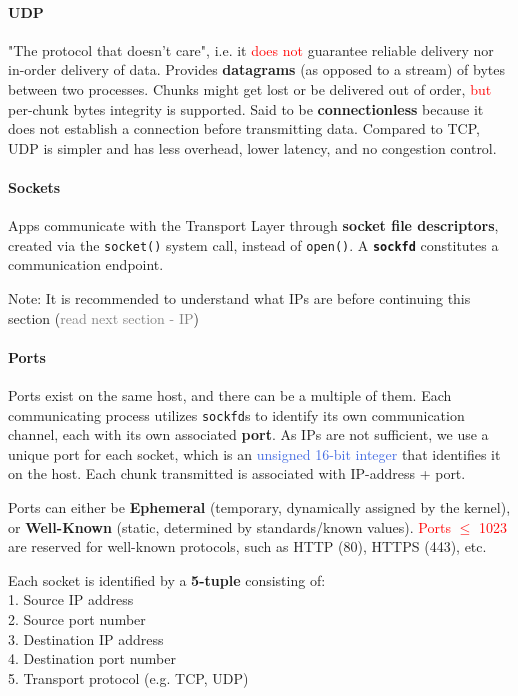 \documentclass[openany,12pt]{book}
\newcommand{\code}[1]{\texttt{#1}}
\newcommand{\red}[1]{\textcolor{Red}{#1}}
\newcommand{\blue}[1]{\textcolor{RoyalBlue}{#1}}
\newcommand{\gray}[1]{\textcolor{gray}{#1}}
\begin{document}
\paragraph{UDP} "The protocol that doesn't care", i.e. it \red{does not} guarantee reliable delivery nor in-order delivery of data. Provides \textbf{datagrams} (as opposed to a stream) of bytes between two processes. Chunks might get lost or be delivered out of order, \red{but} per-chunk bytes integrity is supported. Said to be \textbf{connectionless} because it does not establish a connection before transmitting data. Compared to TCP, UDP is simpler and has less overhead, lower latency, and no congestion control.

\paragraph{Sockets} Apps communicate with the Transport Layer through \textbf{socket file descriptors}, created via the \code{socket()} system call, instead of \code{open()}. A \textbf{\code{sockfd}} constitutes a communication endpoint.

Note: It is recommended to understand what IPs are before continuing this section (\gray{read next section - IP})

\paragraph{Ports} Ports exist on the same host, and there can be a multiple of them. Each communicating process utilizes \code{sockfd}s to identify its own communication channel, each with its own associated \textbf{port}. As IPs are not sufficient, we use a unique port for each socket, which is an \blue{unsigned 16-bit integer} that identifies it on the host. Each chunk transmitted is associated with IP-address + port.


Ports can either be \textbf{Ephemeral} (temporary, dynamically assigned by the kernel), or \textbf{Well-Known} (static, determined by standards/known values). \red{Ports \(\leq\) 1023} are reserved for well-known protocols, such as HTTP (80), HTTPS (443), etc.

Each socket is identified by a \textbf{5-tuple} consisting of: \\
1. Source IP address \\
2. Source port number \\
3. Destination IP address \\
4. Destination port number \\
5. Transport protocol (e.g. TCP, UDP)
\end{document}
